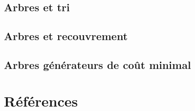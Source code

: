 \documentclass[
  letterpaper,
]{scrbook}
\newlength{\cslhangindent}
\newlength{\cslentryspacingunit} %
\newenvironment{CSLReferences}[2] %
 {%
  \setlength{\parindent}{0pt}
  \ifodd #1
  \let\oldpar\par
  \def\par{\hangindent=\cslhangindent\oldpar}
  \fi
  \setlength{\parskip}{#2\cslentryspacingunit}
 }%
 {}
\theoremstyle{plain}
\theoremstyle{definition}
\theoremstyle{definition}
\theoremstyle{remark}
\begin{document}
\hypertarget{arbres-et-tri}{%
\section{Arbres et tri}\label{arbres-et-tri}}

\hypertarget{arbres-et-recouvrement}{%
\section{Arbres et recouvrement}\label{arbres-et-recouvrement}}

\hypertarget{arbres-guxe9nuxe9rateurs-de-couxfbt-minimal}{%
\section{Arbres générateurs de coût
minimal}\label{arbres-guxe9nuxe9rateurs-de-couxfbt-minimal}}


\hypertarget{ruxe9fuxe9rences}{%
\chapter*{Références}\label{ruxe9fuxe9rences}}


\hypertarget{refs}{}
\begin{CSLReferences}{0}{0}
\end{CSLReferences}


\backmatter
\end{document}

